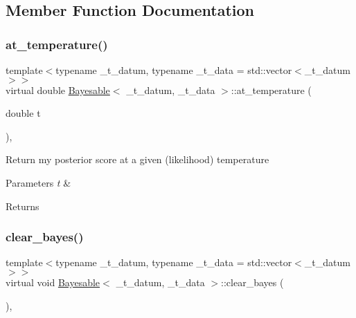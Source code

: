 \subsection{Member Function Documentation}
\mbox{\label{class_bayesable_ac9ba96f829785f07919610941077b4c9}} 
\subsubsection{\texorpdfstring{at\+\_\+temperature()}{at\_temperature()}}
{\footnotesize\ttfamily template$<$typename \+\_\+t\+\_\+datum, typename \+\_\+t\+\_\+data = std\+::vector$<$\+\_\+t\+\_\+datum$>$$>$ \\
virtual double \hyperlink{class_bayesable}{Bayesable}$<$ \+\_\+t\+\_\+datum, \+\_\+t\+\_\+data $>$\+::at\+\_\+temperature (\begin{DoxyParamCaption}\item[{double}]{t }\end{DoxyParamCaption})\hspace{0.3cm}{\ttfamily [inline]}, {\ttfamily [virtual]}}

Return my posterior score at a given (likelihood) temperature 
\begin{DoxyParams}{Parameters}
{\em t} & \\
\hline
\end{DoxyParams}
\begin{DoxyReturn}{Returns}

\end{DoxyReturn}
\mbox{\label{class_bayesable_a3c7deaa8b0a270f806507a2a0768c54b}} 
\subsubsection{\texorpdfstring{clear\+\_\+bayes()}{clear\_bayes()}}
{\footnotesize\ttfamily template$<$typename \+\_\+t\+\_\+datum, typename \+\_\+t\+\_\+data = std\+::vector$<$\+\_\+t\+\_\+datum$>$$>$ \\
virtual void \hyperlink{class_bayesable}{Bayesable}$<$ \+\_\+t\+\_\+datum, \+\_\+t\+\_\+data $>$\+::clear\+\_\+bayes (\begin{DoxyParamCaption}{ }\end{DoxyParamCaption})\hspace{0.3cm}{\ttfamily [inline]}, {\ttfamily [virtual]}}

